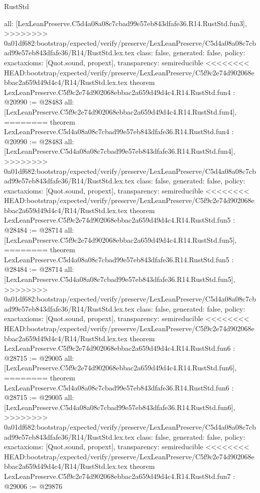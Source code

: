 \begin{lexlean}{RustStd}
\begin{coremodule}
{\begin{coremodule}
{{{{{{{  all: [LexLeanPreserve.C5d4a08a08c7cbad99e57eb843dfafe36.R14.RustStd.fun3],
>>>>>>>> 0a01df682:bootstrap/expected/verify/preserve/LexLeanPreserve/C5d4a08a08c7cbad99e57eb843dfafe36/R14/RustStd.lex.tex
  class: false,
  generated: false,
  policy: exact{axioms: [Quot.sound, propext]},
  transparency: semireducible
}
<<<<<<<< HEAD:bootstrap/expected/verify/preserve/LexLeanPreserve/C5f9c2e74d902068ebbac2a659d49d4c4/R14/RustStd.lex.tex
theorem LexLeanPreserve.C5f9c2e74d902068ebbac2a659d49d4c4.R14.RustStd.fun4 : @20990 := @28483 {
  all: [LexLeanPreserve.C5f9c2e74d902068ebbac2a659d49d4c4.R14.RustStd.fun4],
========
theorem LexLeanPreserve.C5d4a08a08c7cbad99e57eb843dfafe36.R14.RustStd.fun4 : @20990 := @28483 {
  all: [LexLeanPreserve.C5d4a08a08c7cbad99e57eb843dfafe36.R14.RustStd.fun4],
>>>>>>>> 0a01df682:bootstrap/expected/verify/preserve/LexLeanPreserve/C5d4a08a08c7cbad99e57eb843dfafe36/R14/RustStd.lex.tex
  class: false,
  generated: false,
  policy: exact{axioms: [Quot.sound, propext]},
  transparency: semireducible
}
<<<<<<<< HEAD:bootstrap/expected/verify/preserve/LexLeanPreserve/C5f9c2e74d902068ebbac2a659d49d4c4/R14/RustStd.lex.tex
theorem LexLeanPreserve.C5f9c2e74d902068ebbac2a659d49d4c4.R14.RustStd.fun5 : @28484 := @28714 {
  all: [LexLeanPreserve.C5f9c2e74d902068ebbac2a659d49d4c4.R14.RustStd.fun5],
========
theorem LexLeanPreserve.C5d4a08a08c7cbad99e57eb843dfafe36.R14.RustStd.fun5 : @28484 := @28714 {
  all: [LexLeanPreserve.C5d4a08a08c7cbad99e57eb843dfafe36.R14.RustStd.fun5],
>>>>>>>> 0a01df682:bootstrap/expected/verify/preserve/LexLeanPreserve/C5d4a08a08c7cbad99e57eb843dfafe36/R14/RustStd.lex.tex
  class: false,
  generated: false,
  policy: exact{axioms: [Quot.sound, propext]},
  transparency: semireducible
}
<<<<<<<< HEAD:bootstrap/expected/verify/preserve/LexLeanPreserve/C5f9c2e74d902068ebbac2a659d49d4c4/R14/RustStd.lex.tex
theorem LexLeanPreserve.C5f9c2e74d902068ebbac2a659d49d4c4.R14.RustStd.fun6 : @28715 := @29005 {
  all: [LexLeanPreserve.C5f9c2e74d902068ebbac2a659d49d4c4.R14.RustStd.fun6],
========
theorem LexLeanPreserve.C5d4a08a08c7cbad99e57eb843dfafe36.R14.RustStd.fun6 : @28715 := @29005 {
  all: [LexLeanPreserve.C5d4a08a08c7cbad99e57eb843dfafe36.R14.RustStd.fun6],
>>>>>>>> 0a01df682:bootstrap/expected/verify/preserve/LexLeanPreserve/C5d4a08a08c7cbad99e57eb843dfafe36/R14/RustStd.lex.tex
  class: false,
  generated: false,
  policy: exact{axioms: [Quot.sound, propext]},
  transparency: semireducible
}
<<<<<<<< HEAD:bootstrap/expected/verify/preserve/LexLeanPreserve/C5f9c2e74d902068ebbac2a659d49d4c4/R14/RustStd.lex.tex
theorem LexLeanPreserve.C5f9c2e74d902068ebbac2a659d49d4c4.R14.RustStd.fun7 : @29006 := @29876 {
}}}}}}}}}}
\end{coremodule}}
\end{coremodule}
\end{lexlean}
